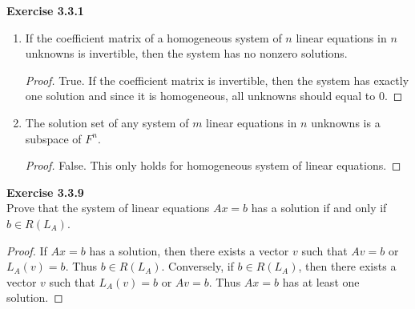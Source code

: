 \documentclass[12pt, a4paper]{article}
\theoremstyle{plain}
\newenvironment{exercise}[2][Exercise]
    { \begin{mdframed}[backgroundcolor=gray!20] \textbf{#1 #2} \\}
    {  \end{mdframed}}
\begin{document}
\begin{exercise}{3.3.1}
\begin{enumerate}[label=(\alph*)]
\begin{proof}
	False. A homogeneous system always have a solution, but system of linear equations is not.
	\end{proof}
\item If the coefficient matrix of a homogeneous system of $n$ linear equations in $n$ unknowns is invertible, then the system has no nonzero solutions.
	\begin{proof}
	True. If the coefficient matrix is invertible, then the system has exactly one solution and since it is homogeneous, all unknowns should equal to $0$.
	\end{proof}
\item The solution set of any system of $m$ linear equations in $n$ unknowns is a subspace of $F^n$.
	\begin{proof}
	False. This only holds for homogeneous system of linear equations.
	\end{proof}
\end{enumerate}
\end{exercise}

\begin{exercise}{3.3.9}
Prove that the system of linear equations $Ax=b$ has a solution if and only if $b\in R(L_A)$.
\end{exercise}
	\begin{proof}
	If $Ax=b$ has a solution, then there exists a vector $v$ such that $Av=b$ or $L_A(v)=b$. Thus $b\in R(L_A)$. Conversely, if $b\in R(L_A)$, then there exists a vector $v$ such that $L_A(v)=b$ or $Av=b$. Thus $Ax=b$ has at least one solution.
	\end{proof}

\pagebreak
\end{document}
